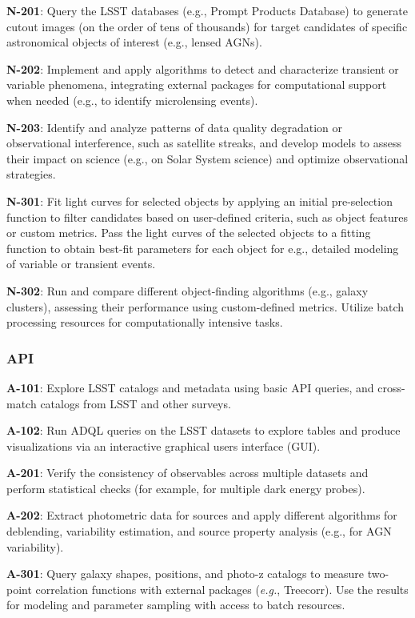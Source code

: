 \textbf{N-201}: Query the LSST databases (e.g., Prompt Products Database) to generate cutout images (on the order of tens of thousands) for target candidates of specific astronomical objects of interest (e.g., lensed AGNs).

\textbf{N-202}: Implement and apply algorithms to detect and characterize transient or variable phenomena, integrating external packages for computational support when needed (e.g., to identify microlensing events).

\textbf{N-203}: Identify and analyze patterns of data quality degradation or observational interference, such as satellite streaks, and develop models to assess their impact on science (e.g., on Solar System science) and optimize observational strategies.

\textbf{N-301}: Fit light curves for selected objects by applying an initial pre-selection function to filter candidates based on user-defined criteria, such as object features or custom metrics.
Pass the light curves of the selected objects to a fitting function to obtain best-fit parameters for each object for e.g.,  detailed modeling of variable or transient events. 

\textbf{N-302}: Run and compare different object-finding algorithms (e.g., galaxy clusters), assessing their performance using custom-defined metrics. Utilize batch processing resources for computationally intensive tasks.

\subsubsection{API}

\textbf{A-101}: Explore LSST catalogs and metadata using basic API queries, and cross-match catalogs from LSST and other surveys.

\textbf{A-102}: Run ADQL queries on the LSST datasets to explore tables and produce visualizations via an interactive graphical users interface (GUI).

\textbf{A-201}: Verify the consistency of observables across multiple datasets and perform statistical checks (for example, for multiple dark energy probes). 

\textbf{A-202}: Extract photometric data for sources and apply different algorithms for deblending, variability estimation, and source property analysis (e.g., for AGN variability). 

\textbf{A-301}: Query galaxy shapes, positions, and photo-z catalogs to measure two-point correlation functions with external packages (\emph{e.g.}, Treecorr).
Use the results for modeling and parameter sampling with access to batch resources.

